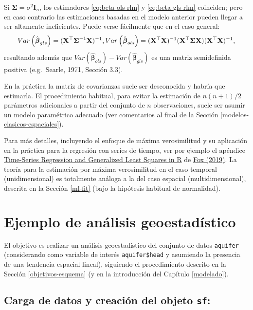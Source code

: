 \documentclass[
]{book}
\theoremstyle{break}
\theoremstyle{definition}
\theoremstyle{definition}
\theoremstyle{definition}
\theoremstyle{definition}
\theoremstyle{remark}
\begin{document}
Si \(\boldsymbol{\Sigma}=\sigma^{2} \mathbf{I}_{n}\), los estimadores \eqref{eq:beta-ols-rlm} y \eqref{eq:beta-gls-rlm} coinciden; pero en caso contrario las estimaciones basadas en el modelo anterior pueden llegar a ser altamente ineficientes.
Puede verse fácilmente que en el caso general:
\[Var\left( \hat{\boldsymbol{\beta}}_{gls} \right)=(\mathbf{X}^{\top}\boldsymbol{\Sigma}^{-1} \mathbf{X})^{-1}, \\
Var\left( \hat{\boldsymbol{\beta}}_{ols} \right) =(\mathbf{X}^{\top}\mathbf{X})^{-1} (\mathbf{X}^{\top}\boldsymbol{\Sigma}\mathbf{X})(\mathbf{X}^{\top}\mathbf{X})^{-1},\]
resultando además que \(Var( \hat{\boldsymbol{\beta}}_{ols}) - Var( \hat{\boldsymbol{\beta}}_{gls} )\) es una matriz semidefinida positiva (e.g.~Searle, 1971, Sección 3.3).

En la práctica la matriz de covarianzas suele ser desconocida y habría que estimarla.
El procedimiento habitual, para evitar la estimación de \(n(n+1)/2\) parámetros adicionales a partir del
conjunto de \(n\) observaciones, suele ser asumir un modelo paramétrico adecuado (ver comentarios al final de la Sección \ref{modelos-clasicos-espaciales}).

Para más detalles, incluyendo el enfoque de máxima verosimilitud y su aplicación en la práctica para la regresión con series de tiempo, ver por ejemplo el apéndice \href{https://www.john-fox.ca/Companion/appendices/Appendix-Timeseries-Regression.pdf}{Time-Series Regression and Generalized Least Squares in R} de \href{https://www.john-fox.ca/Companion/}{Fox (2019)}.
La teoría para la estimación por máxima verosimilitud en el caso temporal (unidimensional) es totalmente análoga a la del caso espacial (multidimensional), descrita en la Sección \ref{ml-fit} (bajo la hipótesis habitual de normalidad).

\chapter{Ejemplo de análisis geoestadístico}\label{ejemplo-aquifer}

El objetivo es realizar un análisis geoestadístico del conjunto de datos \texttt{aquifer} (considerando como variable de interés \texttt{aquifer\$head} y asumiendo la presencia de una tendencia espacial lineal), siguiendo el procedimiento descrito en la Sección \ref{objetivos-esquema} (y en la introducción del Capítulo \ref{modelado}).

\section{\texorpdfstring{Carga de datos y creación del objeto \texttt{sf}:}{Carga de datos y creación del objeto sf:}}\label{carga-de-datos-y-creaciuxf3n-del-objeto-sf}
\end{document}
